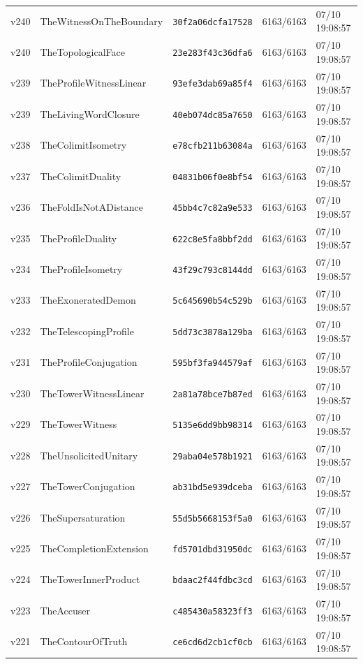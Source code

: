 \documentclass[11pt]{article}
\theoremstyle{definition}\newtheorem{deriv}{Derivation}
\begin{document}
{\begin{longtable}{@{}lllll@{}}
v240 & TheWitnessOnTheBoundary & \texttt{30f2a06dcfa17528} & 6163/6163 & 07/10 19:08:57 \\
v240 & TheTopologicalFace & \texttt{23e283f43c36dfa6} & 6163/6163 & 07/10 19:08:57 \\
v239 & TheProfileWitnessLinear & \texttt{93efe3dab69a85f4} & 6163/6163 & 07/10 19:08:57 \\
v239 & TheLivingWordClosure & \texttt{40eb074dc85a7650} & 6163/6163 & 07/10 19:08:57 \\
v238 & TheColimitIsometry & \texttt{e78cfb211b63084a} & 6163/6163 & 07/10 19:08:57 \\
v237 & TheColimitDuality & \texttt{04831b06f0e8bf54} & 6163/6163 & 07/10 19:08:57 \\
v236 & TheFoldIsNotADistance & \texttt{45bb4c7c82a9e533} & 6163/6163 & 07/10 19:08:57 \\
v235 & TheProfileDuality & \texttt{622c8e5fa8bbf2dd} & 6163/6163 & 07/10 19:08:57 \\
v234 & TheProfileIsometry & \texttt{43f29c793c8144dd} & 6163/6163 & 07/10 19:08:57 \\
v233 & TheExoneratedDemon & \texttt{5c645690b54c529b} & 6163/6163 & 07/10 19:08:57 \\
v232 & TheTelescopingProfile & \texttt{5dd73c3878a129ba} & 6163/6163 & 07/10 19:08:57 \\
v231 & TheProfileConjugation & \texttt{595bf3fa944579af} & 6163/6163 & 07/10 19:08:57 \\
v230 & TheTowerWitnessLinear & \texttt{2a81a78bce7b87ed} & 6163/6163 & 07/10 19:08:57 \\
v229 & TheTowerWitness & \texttt{5135e6dd9bb98314} & 6163/6163 & 07/10 19:08:57 \\
v228 & TheUnsolicitedUnitary & \texttt{29aba04e578b1921} & 6163/6163 & 07/10 19:08:57 \\
v227 & TheTowerConjugation & \texttt{ab31bd5e939dceba} & 6163/6163 & 07/10 19:08:57 \\
v226 & TheSupersaturation & \texttt{55d5b5668153f5a0} & 6163/6163 & 07/10 19:08:57 \\
v225 & TheCompletionExtension & \texttt{fd5701dbd31950dc} & 6163/6163 & 07/10 19:08:57 \\
v224 & TheTowerInnerProduct & \texttt{bdaac2f44fdbc3cd} & 6163/6163 & 07/10 19:08:57 \\
v223 & TheAccuser & \texttt{c485430a58323ff3} & 6163/6163 & 07/10 19:08:57 \\
v221 & TheContourOfTruth & \texttt{ce6cd6d2cb1cf0cb} & 6163/6163 & 07/10 19:08:57 \\

\end{longtable}}
\end{document}
